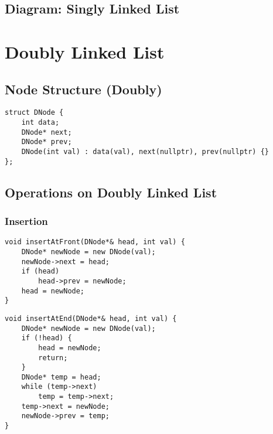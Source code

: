 \subsection{Diagram: Singly Linked List}
\begin{center}
\end{center}

\newpage

\section{Doubly Linked List}

\subsection{Node Structure (Doubly)}
\begin{lstlisting}[style=cppstyle, caption={Doubly Linked List Node Structure in C++}]
struct DNode {
    int data;
    DNode* next;
    DNode* prev;
    DNode(int val) : data(val), next(nullptr), prev(nullptr) {}
};
\end{lstlisting}

\subsection{Operations on Doubly Linked List}
\subsubsection{Insertion}
\begin{lstlisting}[style=cppstyle, caption={Insert at Front in Doubly Linked List}]
void insertAtFront(DNode*& head, int val) {
    DNode* newNode = new DNode(val);
    newNode->next = head;
    if (head)
        head->prev = newNode;
    head = newNode;
}
\end{lstlisting}

\begin{lstlisting}[style=cppstyle, caption={Insert at End in Doubly Linked List}]
void insertAtEnd(DNode*& head, int val) {
    DNode* newNode = new DNode(val);
    if (!head) {
        head = newNode;
        return;
    }
    DNode* temp = head;
    while (temp->next)
        temp = temp->next;
    temp->next = newNode;
    newNode->prev = temp;
}
\end{lstlisting}

